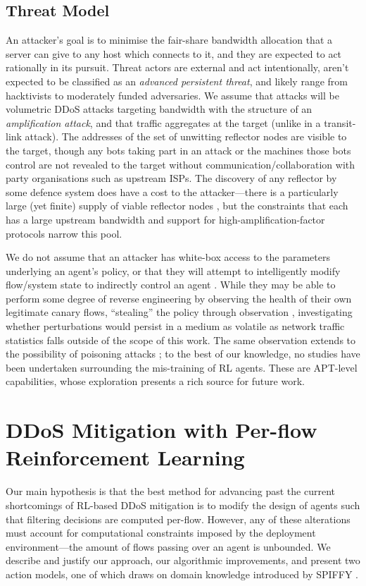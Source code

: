 \documentclass[10pt, times, conference, letterpaper]{IEEEtran}
\begin{document}
\subsection{Threat Model}
An attacker's goal is to minimise the fair-share bandwidth allocation that a server can give to any host which connects to it, and they are expected to act rationally in its pursuit.
Threat actors are external and act intentionally, aren't expected to be classified as an \emph{advanced persistent threat}, and likely range from hacktivists to moderately funded adversaries.
We assume that attacks will be volumetric DDoS attacks targeting bandwidth with the structure of an \emph{amplification attack}, and that traffic aggregates at the target (unlike in a transit-link attack).
The addresses of the set of unwitting reflector nodes are visible to the target, though any bots taking part in an attack or the machines those bots control are not revealed to the target without communication/collaboration with  party organisations such as upstream ISPs.
The discovery of any reflector by some defence system does have a cost to the attacker---there is a particularly large (yet finite) supply of viable reflector nodes \cite{DBLP:conf/ndss/Rossow14}, but the constraints that each has a large upstream bandwidth and support for high-amplification-factor protocols narrow this pool.

We do not assume that an attacker has white-box access to the parameters underlying an agent's policy, or that they will attempt to intelligently modify flow/system state to indirectly control an agent \cite{DBLP:conf/eurosp/PapernotMJFCS16, DBLP:conf/eurosp/PapernotMSW18, DBLP:journals/corr/HuangPGDA17, DBLP:conf/sp/Carlini017}.
While they may be able to perform some degree of reverse engineering by observing the health of their own legitimate canary flows, ``stealing'' the policy through observation \cite{DBLP:conf/uss/TramerZJRR16}, investigating whether perturbations would persist in a medium as volatile as network traffic statistics falls outside of the scope of this work.
The same observation extends to the possibility of poisoning attacks \cite{DBLP:journals/jmlr/KloftL10, DBLP:conf/acsac/ShenTS16}; to the best of our knowledge, no studies have been undertaken surrounding the mis-training of RL agents.
These are APT-level capabilities, whose exploration presents a rich source for future work.

\section{DDoS Mitigation with Per-flow Reinforcement Learning}\label{sec:ddos-mitigation-with-per-flow-reinforcement-learning}
Our main hypothesis is that the best method for advancing past the current shortcomings of RL-based DDoS mitigation is to modify the design of agents such that filtering decisions are computed per-flow.
However, any of these alterations must account for computational constraints imposed by the deployment environment---the amount of flows passing over an agent is unbounded.
We describe and justify our approach, our algorithmic improvements, and present two action models, one of which draws on domain knowledge introduced by SPIFFY \cite{DBLP:conf/ndss/KangGS16}.
\end{document}
